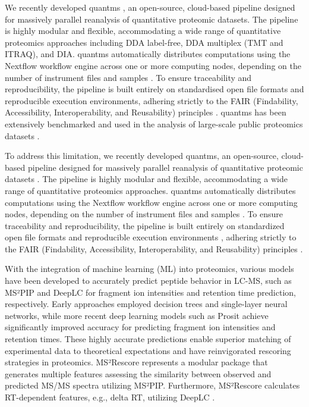 \documentclass[12pt]{article}
\begin{document}
We recently developed quantms \cite{dai_quantms_2024}, an open-source, cloud-based pipeline designed for massively parallel reanalysis of quantitative proteomic datasets. The pipeline is highly modular and flexible, accommodating a wide range of quantitative proteomics approaches including DDA label-free, DDA multiplex (TMT and ITRAQ), and DIA.
quantms automatically distributes computations using the Nextflow workflow engine across one or more computing nodes, depending on the number of instrument files and samples \cite{di_tommaso_nextflow_2017}. To ensure traceability and reproducibility, the pipeline is built entirely on standardised open file formats and reproducible execution environments, adhering strictly to the FAIR (Findability, Accessibility, Interoperability, and Reusability) principles \cite{wilkinson_fair_2016}. quantms has been extensively benchmarked and used in the analysis of large-scale public proteomics datasets \cite{dai_quantms_2024,bai2023lfq, ZHENG2025105440}.

To address this limitation, we recently developed quantms, an open-source, cloud-based pipeline designed for massively parallel reanalysis of quantitative proteomic datasets \cite{dai_quantms_2024}. The pipeline is highly modular and flexible, accommodating a wide range of quantitative proteomics approaches. quantms automatically distributes computations using the Nextflow workflow engine across one or more computing nodes, depending on the number of instrument files and samples \cite{di_tommaso_nextflow_2017}. To ensure traceability and reproducibility, the pipeline is built entirely on standardized open file formats and reproducible execution environments \cite{dai_proteomics_2021} \cite{martens_mzmlcommunity_2011}, adhering strictly to the FAIR (Findability, Accessibility, Interoperability, and Reusability) principles \cite{wilkinson_fair_2016}.

With the integration of machine learning (ML) into proteomics, various models have been developed to accurately predict peptide behavior in LC-MS, such as MS²PIP \cite{degroeve_ms2pip_2013} and DeepLC \cite{bouwmeester_deeplc_2021} for fragment ion intensities and retention time prediction, respectively. Early approaches employed decision trees and single-layer neural networks, while more recent deep learning models such as Prosit \cite{gessulat_prosit_2019} achieve significantly improved accuracy for predicting fragment ion intensities and retention times. These highly accurate predictions enable superior matching of experimental data to theoretical expectations and have reinvigorated rescoring strategies in proteomics. %
MS²Rescore represents a modular package that generates multiple features assessing the similarity between observed and predicted MS/MS spectra utilizing MS²PIP. Furthermore, MS²Rescore calculates RT-dependent features, e.g., delta RT, utilizing DeepLC \cite{buur_ms2_2024}.
\end{document}
